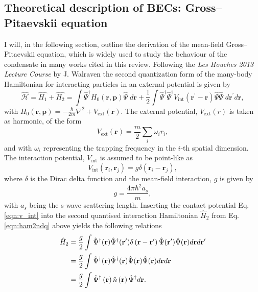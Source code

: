 \subsection{Theoretical description of BECs: Gross--Pitaevskii equation}\label{sub:gpederiv}
I will, in the following section, outline the derivation of the mean-field Gross--Pitaevskii equation, which is widely used to study the behaviour of the condensate in many works cited in this review. Following the \textit{Les Houches 2013 Lecture Course} by J. Walraven \cite{LEC:Walraven_lh_2013} the second quantization form of the many-body Hamiltonian for interacting particles in an external potential is given by
\begin{equation}\label{eqn:ham2ndq}
\hat{\mathcal{H}} = \hat{H_1} + \hat{H_2} = \int \hat{\Psi}^{\dagger} H_0\left(\textbf{r},\textbf{p} \right)  \hat{\Psi} \; d\textbf{r}  + \frac{1}{2} \int\hat{\Psi}^{\dagger}\hat{\Psi}^{\dagger}V_{\textrm{int}}(\textbf{r}^\prime-\textbf{r})\hat{\Psi}\hat{\Psi} \; d\textbf{r}^\prime d\textbf{r},
\end{equation}
with $H_0\left(\textbf{r}, \textbf{p} \right) = -\frac{\hbar}{2m}\nabla^2 + V_{\textrm{ext}}\left(\textbf{r}\right)$. The external potential, $V_{\text{ext}}(r)$ is taken as harmonic, of the form
\begin{equation}
V_{\text{ext}}(\textbf{r}) = \frac{m}{2}\displaystyle\sum_{i}{\omega_i r_i},
\end{equation}
and with $\omega_i$ representing the trapping frequency in the $i$-th spatial dimension. The interaction potential, $V_{\text{int}}$ is assumed to be point-like as
\begin{equation}\label{eqn:v_int}
	V_{\text{int}}\left(\textbf{r}_i,\textbf{r}_j \right) = g\delta\left(\textbf{r}_i - \textbf{r}_j\right),
\end{equation} where $\delta$ is the Dirac delta function and the mean-field interaction, $g$ is given by
\begin{equation}
	g = \frac{4\pi\hbar^2 a_s}{m},
\end{equation}
with $a_s$ being the s-wave scattering length. Inserting the contact potential Eq. \eqref{eqn:v_int} into the second quantised interaction Hamiltonian $\hat{H}_2$ from Eq. \eqref{eqn:ham2ndq} above yields the following relations
\begin{subequations}
\begin{align}
\hat{H}_2 &= \frac{g}{2} \int \hat{\Psi}^{\dagger}(\textbf{r})\hat{\Psi}^{\dagger}(\textbf{r}^{\prime}) \delta\left(\textbf{r} - \textbf{r}^{\prime}\right)\hat{\Psi}(\textbf{r}^{\prime})\hat{\Psi}(\textbf{r})d\textbf{r}d\textbf{r}^{\prime} \\
 & = \frac{g}{2}\int \hat{\Psi}^{\dagger}(\textbf{r})\hat{\Psi}^{\dagger}(\textbf{r}) \hat{\Psi}(\textbf{r})\hat{\Psi}(\textbf{r})d\textbf{r}d\textbf{r} \\
 & = \frac{g}{2}\int \hat{\Psi}^{\dagger}\left(\textbf{r}\right)\hat{n}\left(\textbf{\textbf{r}}\right)\hat{\Psi}^{\dagger}d\textbf{r}.
\end{align}
\end{subequations}

